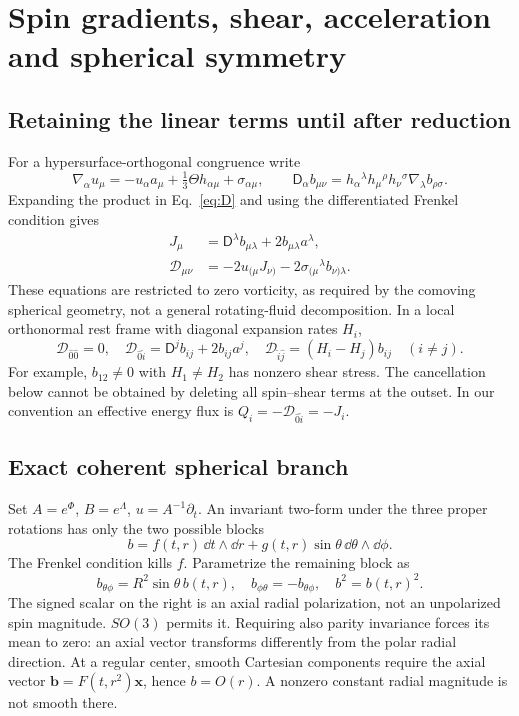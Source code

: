 \section{Spin gradients, shear, acceleration and spherical symmetry}
\subsection{Retaining the linear terms until after reduction}
For a hypersurface-orthogonal congruence write
\begin{equation}
 \nabla_\alpha u_\mu=-u_\alpha a_\mu+\tfrac13\Theta h_{\alpha\mu}+\sigma_{\alpha\mu},\qquad
 \mathsf D_\alpha b_{\mu\nu}=h_\alpha{}^\lambda h_\mu{}^\rho h_\nu{}^\sigma\nabla_\lambda b_{\rho\sigma}.
\end{equation}
Expanding the product in Eq.~\eqref{eq:D} and using the differentiated Frenkel condition gives
\begin{align}
 J_\mu&=\mathsf D^\lambda b_{\mu\lambda}+2b_{\mu\lambda}a^\lambda,\\
 \mathcal D_{\mu\nu}&=-2u_{(\mu}J_{\nu)}-2\sigma_{(\mu}{}^\lambda b_{\nu)\lambda}.\label{eq:decomp}
\end{align}
These equations are restricted to zero vorticity, as required by the comoving spherical geometry, not a general rotating-fluid decomposition. In a local orthonormal rest frame with diagonal expansion rates $H_i$,
\begin{equation}
 \mathcal D_{\hat0\hat0}=0,\quad
 \mathcal D_{\hat0\hat i}=\mathsf D^j b_{ij}+2b_{ij}a^j,\quad
 \mathcal D_{\hat i\hat j}=(H_i-H_j)b_{ij}\quad(i\ne j).
\end{equation}
For example, $b_{12}\ne0$ with $H_1\ne H_2$ has nonzero shear stress. The cancellation below cannot be obtained by deleting all spin--shear terms at the outset. In our convention an effective energy flux is $Q_i=-\mathcal D_{\hat0\hat i}=-J_i$.

\subsection{Exact coherent spherical branch}
Set $A=e^\Phi$, $B=e^\Lambda$, $u=A^{-1}\partial_t$. An invariant two-form under the three proper rotations has only the two possible blocks
\begin{equation}
 b=f(t,r)\,\dd t\wedge\dd r+g(t,r)\sin\theta\,\dd\theta\wedge\dd\phi.
\end{equation}
The Frenkel condition kills $f$. Parametrize the remaining block as
\begin{equation}
 b_{\theta\phi}=R^2\sin\theta\,b(t,r),\quad b_{\phi\theta}=-b_{\theta\phi},\quad b^2=b(t,r)^2.\label{eq:radial}
\end{equation}
The signed scalar on the right is an axial radial polarization, not an unpolarized spin magnitude. $SO(3)$ permits it. Requiring also parity invariance forces its mean to zero: an axial vector transforms differently from the polar radial direction. At a regular center, smooth Cartesian components require the axial vector $\bm b=F(t,r^2)\bm x$, hence $b=O(r)$. A nonzero constant radial magnitude is not smooth there.

